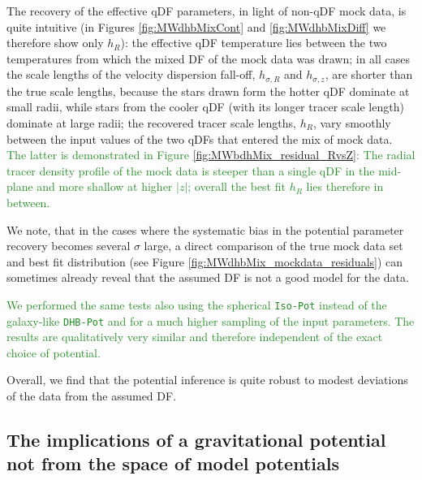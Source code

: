 \documentclass[iop,revtex4]{emulateapj}
\newcommand{\NEW}[1]{\textcolor{ForestGreen}{#1}}
\newcommand{\OLD}[1]{}
\begin{document}
The recovery of the effective qDF parameters, in light of non-qDF mock data, is quite intuitive (in Figures \ref{fig:MWdhbMixCont} and \ref{fig:MWdhbMixDiff} we therefore show only $h_R$): the effective qDF temperature lies between the two temperatures from which the mixed DF of the mock data was drawn; in all cases the scale lengths of the velocity dispersion fall-off, $h_{\sigma,R}$ and $h_{\sigma,z}$, are shorter than the true scale lengths, because the stars drawn form the hotter qDF dominate at small radii, while stars from the cooler qDF (with its longer tracer scale length) dominate at large radii; the recovered tracer scale lengths, $h_R$, vary smoothly between the input values of the two qDFs that entered the mix of mock data\OLD{, with again the impact of contamination by a hotter qDF (with its shorter scale length in this case) being more important}. \NEW{The latter is demonstrated in Figure \ref{fig:MWbdhMix_residual_RvsZ}: The radial tracer density profile of the mock data is steeper than a single qDF in the mid-plane and more shallow at higher $|z|$; overall the best fit $h_R$ lies therefore in between.}

We note, that in the cases where the systematic bias in the potential parameter recovery becomes several $\sigma$ large, a direct comparison of the true mock data set and best fit distribution (see Figure \ref{fig:MWdhbMix_mockdata_residuals}) can sometimes already reveal that the assumed DF is not a good model for the data.

\NEW{We performed the same tests also using the spherical \texttt{Iso-Pot} instead of the galaxy-like \texttt{DHB-Pot} and for a much higher sampling of the input parameters. The results are qualitatively very similar and therefore independent of the exact choice of potential.}

Overall, we find that the potential inference is quite robust to modest deviations of the data from the assumed DF. 

\subsection{The implications of a gravitational potential not from the space of model potentials} \label{sec:results_potential}
\end{document}
